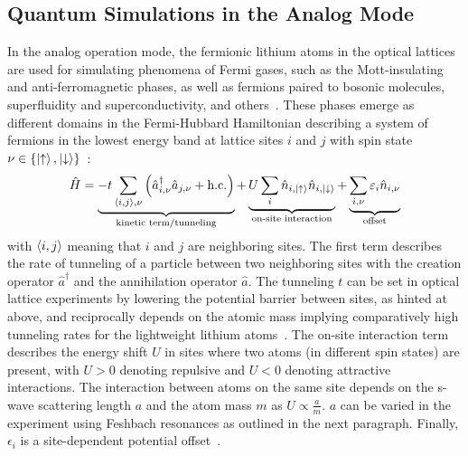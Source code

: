 \subsection*{Quantum Simulations in the Analog Mode}\label{ch:analog_mode}
In the analog operation mode, the fermionic lithium atoms in the optical lattices are used for simulating phenomena of Fermi gases, such as the Mott-insulating and anti-ferromagnetic phases, as well as fermions paired to bosonic molecules, superfluidity and  superconductivity, and others~\cite{bloch_quantum_2012,esslinger_fermi-hubbard_2010}. These phases emerge as different domains in the Fermi-Hubbard Hamiltonian describing a system of fermions in the lowest energy band at lattice sites $i$ and $j$ with spin state $\nu \in \{\Ket{\uparrow}, \Ket{\downarrow}\}$~\cite{hubbard_electron_1963,esslinger_fermi-hubbard_2010}:
\begin{align}\label{eq:fermi_hubbard_hamiltonian}
    \hat H =
    \underbrace{-t \sum\limits_{\Braket{i,j}, \nu} \left(\hat a^\dagger_{i, \nu} \hat a_{j, \nu} + \text{h.c.}\right)}_\text{kinetic term/tunneling}
    + \underbrace{U \sum\limits_i \hat n_{i, \Ket{\uparrow}} \hat n_{i, \Ket{\downarrow}}}_\text{on-site interaction}
    + \underbrace{\sum\limits_{i, \nu} \epsilon_{i} \hat n_{i, \nu}}_\text{offset}
\end{align}
with $\Braket{i,j}$ meaning that $i$ and $j$ are neighboring sites. The first term describes the rate of tunneling of a particle between two neighboring sites with the creation operator $\hat a^\dagger$ and the annihilation operator $\hat a$. The tunneling $t$ can be set in optical lattice experiments by lowering the potential barrier between sites, as hinted at above, and reciprocally depends on the atomic mass implying comparatively high tunneling rates for the lightweight lithium atoms~\cite{jaksch_cold_1998}. The on-site interaction term describes the energy shift $U$ in sites where two atoms (in different spin states) are present, with $U > 0$ denoting repulsive and $U < 0$ denoting attractive interactions. The interaction between atoms on the same site depends on the s-wave scattering length $a$ and the atom mass $m$ as $U \propto \frac{a}{m}$. $a$ can be varied in the experiment using Feshbach resonances as outlined in the next paragraph. Finally, $\epsilon_i$ is a site-dependent potential offset~\cite{esslinger_fermi-hubbard_2010}.

